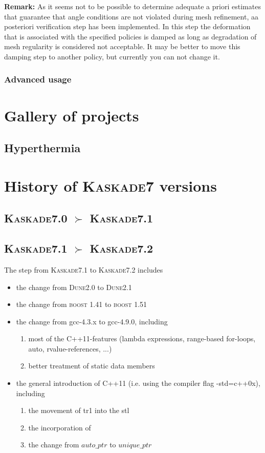 \documentclass[11pt]{article}
\newcommand{\K}{\textsc{Kaskade7 }}
\begin{document}
\noindent \textbf{Remark:} As it seems not to be possible to determine adequate a priori estimates that guarantee that angle conditions are not violated during mesh refinement, aa posteriori verification step has been implemented. In this step the deformation that is associated with the specified policies is damped as long as degradation of mesh regularity is considered not acceptable.
It may be better to move this damping step to another policy, but currently you can not change it. 

\subsubsection{Advanced usage}


\section{Gallery of projects} \label{projects}
\subsection{Hyperthermia} \label{hyperthermia}




\section{History of \K versions} 
\subsection{\textsc{Kaskade7.0} $\succ$ \textsc{Kaskade7.1}}
\subsection{\textsc{Kaskade7.1} $\succ$ \textsc{Kaskade7.2}}
The step from \textsc{Kaskade7.1} to \textsc{Kaskade7.2} includes
\begin{itemize}
 \item the change from \textsc{Dune2.0} to \textsc{Dune2.1}
 \item the change from \textsc{boost 1.41} to \textsc{boost 1.51}
 \item the change from gcc-4.3.x to gcc-4.9.0, including
 \begin{enumerate}
  \item most of the C++11-features (lambda expressions, range-based for-loops, auto, rvalue-references, ...)
  \item better treatment of static data members
 \end{enumerate}

 \item the general introduction of C++11 (i.e. using the compiler flag -std=c++0x), including
 \begin{enumerate}
  \item the movement of tr1 into the stl
  \item the incorporation of 
  \item the change from $auto\_ptr$ to $unique\_ptr$
 \end{enumerate}

\end{itemize}
\end{document}
